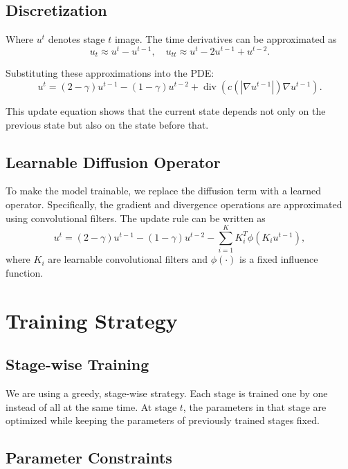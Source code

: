 \documentclass[conference]{IEEEtran}
\begin{document}
\subsection{Discretization}

Where $u^t$ denotes stage $t$ image. The time derivatives can be approximated as
\begin{equation}
u_t \approx u^t - u^{t-1}, \quad
u_{tt} \approx u^t - 2u^{t-1} + u^{t-2}.
\end{equation}

Substituting these approximations into the PDE:
\begin{equation}
u^t = (2 - \gamma)u^{t-1} - (1 - \gamma)u^{t-2} + \operatorname{div}(c(|\nabla u^{t-1}|)\nabla u^{t-1}).
\end{equation}

This update equation shows that the current state depends not only on the previous state but also on the state before that.

\subsection{Learnable Diffusion Operator}

To make the model trainable, we replace the diffusion term with a learned operator. Specifically, the gradient and divergence operations are approximated using convolutional filters. The update rule can be written as
\begin{equation}
u^t = (2 - \gamma)u^{t-1} - (1 - \gamma)u^{t-2} - \sum_{i=1}^{K} K_i^T \phi(K_i u^{t-1}),
\end{equation}
where $K_i$ are learnable convolutional filters and $\phi(\cdot)$ is a fixed influence function.

\section{Training Strategy}

\subsection{Stage-wise Training}

We are using a greedy, stage-wise strategy. Each stage is trained one by one instead of all at the same time. At stage $t$, the parameters in that stage are optimized while keeping the parameters of previously trained stages fixed.

\subsection{Parameter Constraints}
\end{document}
